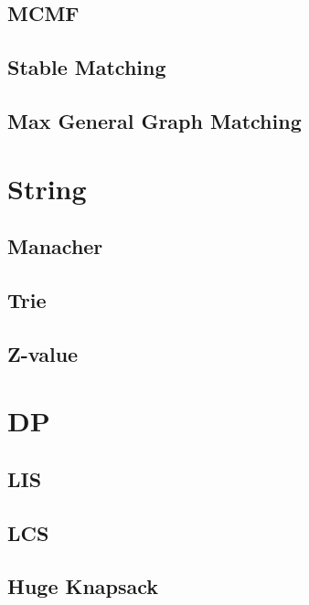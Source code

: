     \subsection{MCMF}
        
    \subsection{Stable Matching}
        
    \subsection{Max General Graph Matching}
        

\section{String}
    \subsection{Manacher}
        
    \subsection{Trie}
        
    \subsection{Z-value}
        

\section{DP}
    \subsection{LIS}
        
    \subsection{LCS}
        
    \subsection{Huge Knapsack}
        
